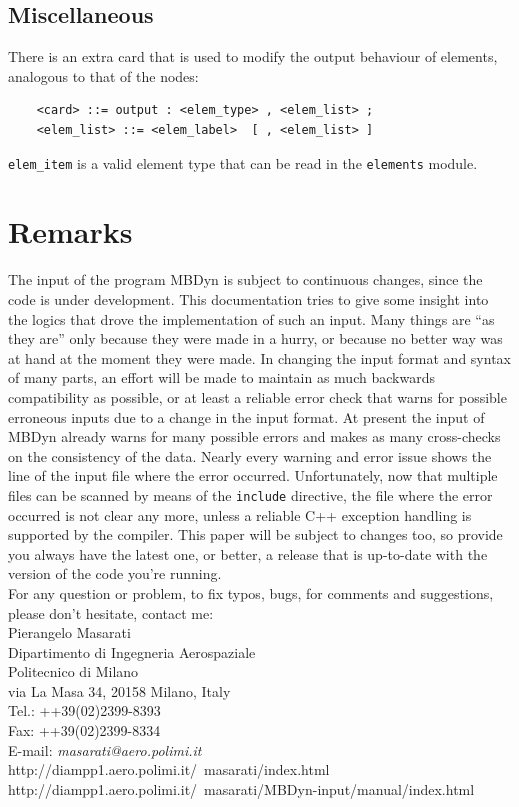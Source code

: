 \documentclass[10pt,dvips]{report}
\begin{document}
\section{Miscellaneous}
There is an extra card that is used to modify the output behaviour of 
elements, analogous to that of the nodes:
\begin{verbatim}
    <card> ::= output : <elem_type> , <elem_list> ;
    <elem_list> ::= <elem_label>  [ , <elem_list> ]
\end{verbatim}
{\tt elem\_item} is a valid element type that can be read in the 
{\tt elements}
module.





\chapter{Remarks}
The input of the program MBDyn is subject to continuous changes, since the
code is under development.
This documentation tries to give some insight into the logics that drove
the implementation of such an input.
Many things are ``as they are'' only because they were made in a hurry, 
or because no better way was at hand at the moment they were made.
In changing the input format and syntax of many parts, an effort 
will be made to maintain as much backwards compatibility as possible,
or at least a reliable error check that warns for possible erroneous 
inputs due to a change in the input format. 
At present the input of MBDyn already warns for many possible errors 
and makes as many cross-checks on the consistency of the data. 
Nearly every warning and error issue shows the line of the input file 
where the error occurred. 
Unfortunately, now that multiple files can be scanned by means of the 
{\tt include} directive, the file where the error occurred is not clear 
any more, unless a reliable C++ exception handling is supported by the
compiler.
This paper will be subject to changes too, so provide you always have the
latest one, or better, a release that is up-to-date with the version of the
code you're running. \\
For any question or problem, to fix typos, bugs, for comments and
suggestions, please don't hesitate, contact me:\vspace{10mm}\\

\noindent
Pierangelo Masarati \\
Dipartimento di Ingegneria Aerospaziale \\
Politecnico di Milano \\
via La Masa 34, 20158 Milano, Italy \\
Tel.: ++39(02)2399-8393 \\
Fax: ++39(02)2399-8334 \\
E-mail: {\em masarati@aero.polimi.it} \\
http://diampp1.aero.polimi.it/~masarati/index.html \\
http://diampp1.aero.polimi.it/~masarati/MBDyn-input/manual/index.html
\end{document}
